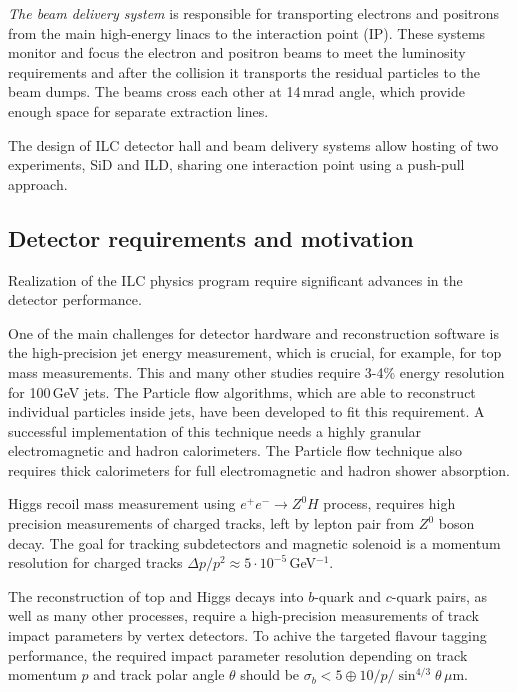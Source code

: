 \textit{The beam delivery system} is responsible for transporting electrons and positrons from the main high-energy linacs to the interaction point (IP). These systems monitor and focus the electron and positron beams to meet the luminosity requirements and after the collision it transports the residual particles to the beam dumps. 
The beams cross each other at 14\,mrad angle, which provide enough space for separate extraction lines. 

The design of ILC detector hall and beam delivery systems allow hosting of two experiments, SiD and ILD, sharing one interaction point using a push-pull approach. 




\subsection{Detector requirements and motivation}

Realization of the ILC physics program require significant advances in the detector performance. 

One of the main challenges for detector hardware and reconstruction software is the high-precision jet energy measurement, which is crucial, for example, for top mass measurements. This and many other studies require 3-4\%  energy resolution for 100\,GeV jets.
The Particle flow algorithms, which are able to reconstruct individual particles inside jets, have been developed to fit this requirement. 
A successful implementation of this technique needs a highly granular electromagnetic and hadron calorimeters.
The Particle flow technique also requires thick calorimeters for full electromagnetic and hadron shower absorption.

Higgs recoil mass measurement using $e^+e^- \to Z^0H$ process, requires high precision measurements of charged tracks, left by lepton pair from $Z^0$ boson decay. The goal for tracking subdetectors and magnetic solenoid is a momentum resolution for charged tracks $\Delta p/ p^2 \approx 5 \cdot 10^{-5}$\,GeV$^{-1}$.

The reconstruction of top and Higgs decays into $b$-quark and $c$-quark pairs, as well as many other processes, require a high-precision measurements of track impact parameters by vertex detectors. To achive the targeted flavour tagging performance, the required impact parameter resolution depending on track momentum $p$ and track polar angle $\theta$ should be $\sigma_b < 5  \oplus 10/p/\sin^{4/3}\theta$\,$\mu$m.

